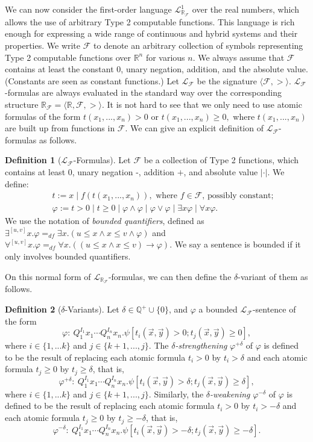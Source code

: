 \documentclass[10pt]{article}
\newcommand{\lrf}{\mathcal{L}_{\mathbb{R}_{\mathcal{F}}}}
\theoremstyle{definition}
\newtheorem{definition}{Definition}[section]
\begin{document}
We can now consider the first-order language $\lrf^1$ over the real numbers, which allows the use of arbitrary Type 2 computable functions. This language is rich enough for expressing a wide range of continuous and hybrid systems and their properties. 
We write $\mathcal{F}$ to denote an arbitrary collection of symbols representing Type 2 computable functions over $\mathbb{R}^n$ for various $n$. We always assume that $\mathcal{F}$ contains at least the constant $0$, unary negation, addition, and the absolute value. (Constants are seen as constant functions.) Let $\mathcal{L_{\mathcal{F}}}$ be the signature $\langle \mathcal{F}, >\rangle$. $\mathcal{L}_{\mathcal{F}}$-formulas are always evaluated in the standard way over the corresponding structure $\mathbb{R}_{\mathcal{F}}= \langle \mathbb{R}, \mathcal{F}, >\rangle$.  It is not hard to see that we only need to use atomic formulas of the form $t(x_1,...,x_n)>0$ or $t(x_1,...,x_n)\geq 0,$ where $t(x_1,...,x_n)$ are built up from functions in $\mathcal{F}$. We can give an explicit definition of $\mathcal{L}_{\mathcal{F}}$-formulas as follows.
\begin{definition}[$\mathcal{L}_{\mathcal{F}}$-Formulas]
Let $\mathcal{F}$ be a collection of Type 2 functions, which contains at least $0$, unary negation -, addition $+$, and absolute value $|\cdot|$. We define:
\begin{eqnarray*}
&&t := x \; | \; f(t(x_1, ..., x_n)), \mbox{ where }f\in \mathcal{F}\mbox{, possibly constant};\\
&&\varphi := t> 0 \; | \; t\geq 0 \; | \; \varphi\wedge\varphi \; | \; \varphi\vee\varphi \; | \; \exists x\varphi \; |\; \forall x\varphi.
\end{eqnarray*}
We use the notation of {\em bounded quantifiers}, defined as $\exists^{[u,v]}x.\varphi =_{df}\exists x. ( u \leq x \land x \leq v \wedge \varphi)$ and $\forall^{[u,v]}x.\varphi =_{df} \forall x. ( (u \leq x \land x \leq v) \rightarrow \varphi)$. We say a sentence is bounded if it only involves bounded quantifiers. 
\end{definition}
On this normal form of $\lrf$-formulas, we can then define the $\delta$-variant of them as follows. 
\begin{definition}[$\delta$-Variants]
Let $\delta\in \mathbb{Q}^+\cup\{0\}$, and $\varphi$ a bounded $\mathcal{L}_{\mathcal{F}}$-sentence of the form
$$\varphi:\ Q_1^{I_1}x_1\cdots Q_n^{I_n}x_n.\psi[t_i(\vec x, \vec y)>0; t_j(\vec x, \vec y)\geq 0],$$
where $i\in\{1,...k\}$ and $j\in\{k+1,...,j\}$. The {\em $\delta$-strengthening} $\varphi^{+\delta}$ of $\varphi$ is defined to be the result of replacing each atomic formula $t_i > 0$ by $t_i > \delta$ and each atomic formula $t_j \geq 0$ by $t_j \geq \delta$, that is,
$$\varphi^{+\delta}:\ Q_1^{I_1}x_1\cdots Q_n^{I_n}x_n.\psi[t_i(\vec x, \vec y)>\delta; t_j(\vec x, \vec y)\geq \delta],$$
where $i\in\{1,...k\}$ and $j\in\{k+1,...,j\}$.
Similarly, the {\em $\delta$-weakening} $\varphi^{-\delta}$ of $\varphi$ is defined to be the result of replacing each atomic formula $t_i > 0$ by $t_i > -\delta$ and each atomic formula $t_j \geq 0$ by $t_j \geq -\delta$, that is,
$$\varphi^{-\delta}:\ Q_1^{I_1}x_1\cdots Q_n^{I_n}x_n.\psi[t_i(\vec x, \vec y)>-\delta; t_j(\vec x, \vec y)\geq -\delta].$$
\end{definition}
\end{document}
